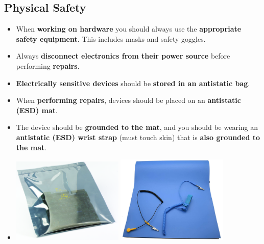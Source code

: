 \documentclass{article}
\begin{document}
    \subsection*{Physical Safety}
    \begin{itemize}
        \item When \textbf{working on hardware} you should always use the \textbf{appropriate safety equipment}. This includes masks and safety goggles.
        \item Always \textbf{disconnect electronics from their power source} before performing \textbf{repairs}.
        \item \textbf{Electrically sensitive devices} should be \textbf{stored in an antistatic bag}.
        \item When \textbf{performing repairs}, devices should be placed on an \textbf{antistatic (ESD) mat}.
        \item The device should be \textbf{grounded to the mat}, and you should be wearing an \textbf{antistatic (ESD) wrist strap} (must touch skin) that is \textbf{also grounded to the mat}.
        \item[] \begin{center}
                    \includegraphics[width=200px]{images/Antistatic-Bag.jpg}
                    \includegraphics[width=200px]{images/ESD-Mat.jpg}
                \end{center}
    \end{itemize}

    
\end{document}

